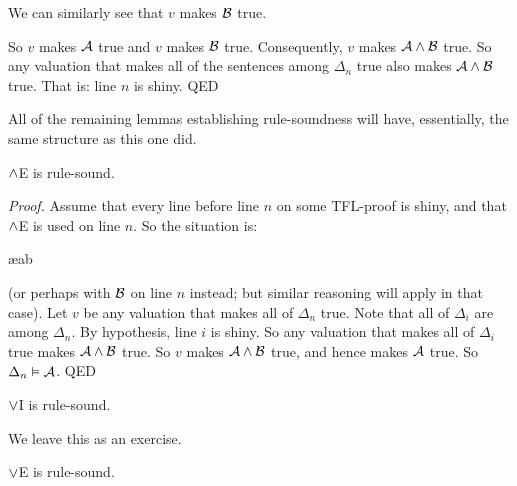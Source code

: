 We can similarly see that $v$ makes $\mathcal{B}$ true.

So $v$ makes $\mathcal{A}$ true and $v$ makes $\mathcal{B}$ true. Consequently, $v$ makes $\mathcal{A}\wedge\mathcal{B}$ true. So any valuation that makes all of the sentences among $\Delta_{n}$ true also makes $\mathcal{A} \wedge \mathcal{B}$ true. That is: line $n$ is shiny. QED


All of the remaining lemmas establishing rule-soundness will have, essentially, the same structure as this one did.

\begin{factoidboxe}$\wedge$E is rule-sound.
\end{factoidboxe}

\emph{Proof.}
	Assume that every line before line $n$ on some TFL-proof is shiny, and that $\wedge$E is used on line $n$. So the situation is:
		   \begin{fitchproof}
			    \ae{ab}
		   \end{fitchproof}\noindent
(or perhaps with $\mathcal{B}$ on line $n$ instead; but similar reasoning will apply in that case). Let $v$ be any valuation that makes all of $\Delta_{n}$ true. Note that all of $\Delta_i$ are among $\Delta_{n}$. By hypothesis, line $i$ is shiny. So any valuation that makes all of $\Delta_i$ true makes $\mathcal{A}\wedge\mathcal{B}$ true. So $v$ makes $\mathcal{A}\wedge\mathcal{B}$ true, and hence makes $\mathcal{A}$ true. So $\Delta_{n} \vDash \mathcal{A}$. QED


\begin{factoidboxe}$\vee$I is rule-sound.
\end{factoidboxe}

We leave this as an exercise.

\begin{factoidboxe}$\vee$E is rule-sound.
\end{factoidboxe}


